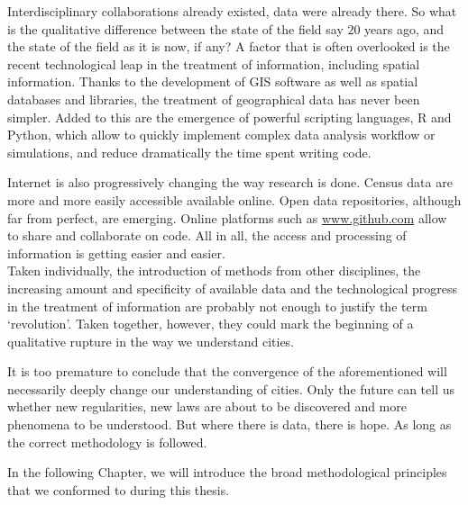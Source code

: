 Interdisciplinary collaborations already existed, data were already there. So
what is the qualitative difference between the state of the field say $20$ years
ago, and the state of the field as it is now, if any? A factor that is often
overlooked is the recent technological leap in the treatment of information,
including spatial information. Thanks to the development of GIS software as well
as spatial databases and libraries, the treatment of geographical data has never
been simpler. Added to this are the emergence of powerful scripting languages, R
and Python, which allow to quickly implement complex data analysis workflow or
simulations, and reduce dramatically the time spent writing code. 

Internet is also progressively changing the way research is done. Census data
are more and more easily accessible available online. Open data repositories,
although far from perfect, are emerging. Online platforms such as
\url{www.github.com} allow to share and collaborate on code. All in all,
the access and processing of information is getting easier and easier.\\


Taken individually, the introduction of methods from other disciplines, the
increasing amount and specificity of available data and the technological
progress in the treatment of information are probably not enough to justify
the term `revolution'. Taken together, however, they could mark the beginning of
a qualitative rupture in the way we understand cities.

It is too premature to conclude that the convergence of the aforementioned will
necessarily deeply change our understanding of cities. Only the future can tell
us whether new regularities, new laws are about to be discovered and more
phenomena to be understood. But where there is data, there is hope.
As long as the correct methodology is followed. 

In the following Chapter, we will introduce the broad methodological principles
that we conformed to during this thesis.

